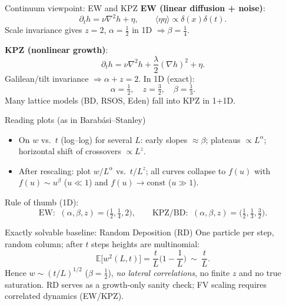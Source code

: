 \documentclass[9pt,table,xcolor=dvipsnames]{beamer}
\begin{document}

\begin{frame}[t]{Continuum viewpoint: EW and KPZ}
\small
\textbf{EW (linear diffusion + noise)}:
\[
\partial_t h=\nu\nabla^2 h+\eta,\qquad \langle\eta\eta\rangle\propto\delta(x)\delta(t).
\]
Scale invariance gives $z=2$, $\alpha=\tfrac12$ in 1D $\Rightarrow \beta=\tfrac14$.

\medskip
\textbf{KPZ (nonlinear growth)}:
\[
\partial_t h=\nu\nabla^2 h+\frac{\lambda}{2}(\nabla h)^2+\eta.
\]
Galilean/tilt invariance $\Rightarrow \alpha+z=2$. In 1D (exact):
\[
\boxed{\alpha=\tfrac12,\quad z=\tfrac32,\quad \beta=\tfrac13.}
\]
Many lattice models (BD, RSOS, Eden) fall into KPZ in 1+1D.
\end{frame}

\begin{frame}[t]{Reading plots (as in Barabási–Stanley)}
\small
\begin{itemize}\itemsep2pt
\item On $w$ vs.\ $t$ (log–log) for several $L$: early slopes $\approx\beta$; plateaus $\propto L^{\alpha}$; horizontal shift of crossovers $\propto L^{z}$.
\item After rescaling: plot $w/L^{\alpha}$ vs.\ $t/L^{z}$; all curves collapse to $f(u)$ with
  $f(u)\sim u^{\beta}$ ($u\!\ll\!1$) and $f(u)\to \text{const}$ ($u\!\gg\!1$).
\end{itemize}
Rule of thumb (1D):
\[
\text{EW: }\ (\alpha,\beta,z)=\Big(\tfrac12,\tfrac14,2\Big),
\qquad
\text{KPZ/BD: }\ (\alpha,\beta,z)=\Big(\tfrac12,\tfrac13,\tfrac32\Big).
\]
\end{frame}

\begin{frame}[t]{Exactly solvable baseline: Random Deposition (RD)}
\small
One particle per step, random column; after $t$ steps heights are multinomial:
\[
\mathbb E\big[w^2(L,t)\big]=\frac{t}{L}\Big(1-\frac1L\Big)\ \sim\ \frac{t}{L}.
\]
Hence $w\sim (t/L)^{1/2}$ ($\beta=\tfrac12$), \emph{no lateral correlations}, no finite $z$ and no true saturation. RD serves as a growth-only sanity check; FV scaling requires correlated dynamics (EW/KPZ).
\end{frame}
\end{document}
